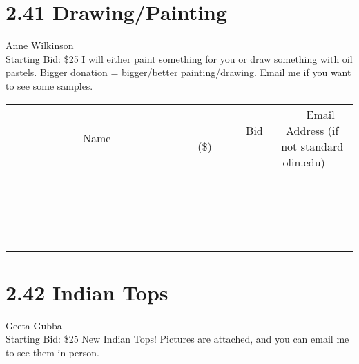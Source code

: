 \documentclass[11pt]{article}
\begin{document}
\section*{2.41 Drawing/Painting}
Anne Wilkinson
\\
Starting Bid: \$25
\newline
I will either paint something for you or draw something with oil pastels. Bigger donation = bigger/better painting/drawing. Email me if you want to see some samples.
\\[3ex]
\begin{tabular}{c c c}
~~~~~~~~~~~~~Name~~~~~~~~~~~~~ & ~~~~~~~~~Bid (\$)~~~~~~~~~  & ~~~Email Address (if not standard olin.edu)~~~\\
 & & \\
\hline
 & & \\
\hline
 & & \\
\hline
 & & \\
\hline
 & & \\
\hline
 & & \\
\hline
 & & \\
\hline
 & & \\
\hline
 & & \\
\hline
 & & \\
\hline
 & & \\
\hline
 & & \\
\hline
 & & \\
\hline
 & & \\
\hline
 & & \\
\hline
 & & \\
\hline
 & & \\
\hline
 & & \\
\hline
 & & \\
\hline
\end{tabular}
\newpage
\section*{2.42 Indian Tops}
Geeta Gubba
\\
Starting Bid: \$25
\newline
New Indian Tops! Pictures are attached, and you can email me to see them in person. 
\end{document}
